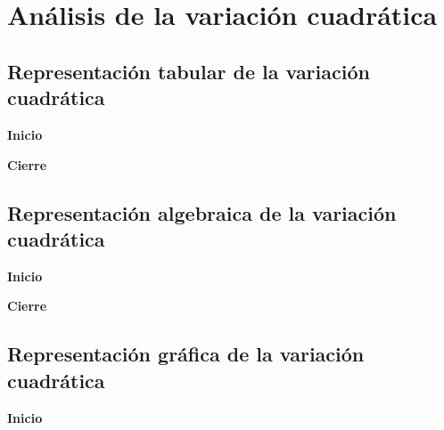 \thispagestyle{plain}
\section{Análisis de la variación cuadrática}


\subsection{Representación tabular de la variación cuadrática}

\begin{boxK}
    \begin{center}\textbf{Inicio}\end{center}

\end{boxK}

\begin{boxK}
    \begin{center}\textbf{Cierre}\end{center}

\end{boxK}

\subsection{Representación algebraica de la variación cuadrática}

\begin{boxK}
    \begin{center}\textbf{Inicio}\end{center}

\end{boxK}

\begin{boxK}
    \begin{center}\textbf{Cierre}\end{center}

\end{boxK}

\subsection{Representación gr\'afica de la variación cuadrática}

\begin{boxK}
    \begin{center}\textbf{Inicio}\end{center}

\end{boxK}

